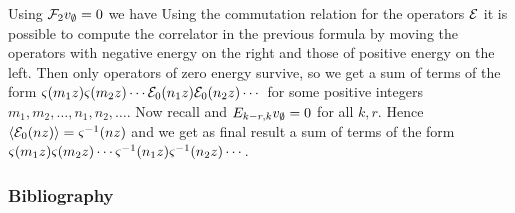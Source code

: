 \documentclass[10pt]{beamer}
\begin{document}
\begin{frame}

Using $\mathcal F_2v_\emptyset=0$ we have
Using the commutation relation for the operators $\mathcal E$ it is possible to compute the correlator in the previous formula by moving the operators with negative energy on the right and those of positive energy on the left. Then only operators of zero energy survive, so we get a sum of terms of the form $\varsigma(m_1z)\varsigma(m_2z)\cdots\mathcal E_0(n_1z)\mathcal E_0(n_2z)\cdots$ for some positive integers $m_1,m_2,\ldots,n_1,n_2,\ldots$.
Now recall
and $E_{k-r,k}v_\emptyset=0$ for all $k,r$. Hence $\langle\mathcal E_0(nz)\rangle=\varsigma^{-1}(nz)$ and we get as final result a sum of terms of the form $\varsigma(m_1z)\varsigma(m_2z)\cdots\varsigma^{-1}(n_1z)\varsigma^{-1}(n_2z)\cdots$.  

\end{frame}

\begin{frame}[allowframebreaks]
\frametitle{Bibliography}
	
	\nocite{*}
	\printbibliography


\end{frame}
\end{document}
